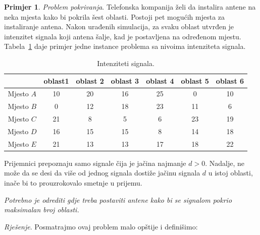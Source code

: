 \documentclass[a4paper, utf8, 11pt, colorlinks]{book}
\theoremstyle{definition}
\newtheorem{primjer}{Primjer}[chapter]
\begin{document}
\begin{primjer}

\emph{Problem pokrivanja}. Telefonska kompanija želi da instalira antene na neka mjesta kako bi pokrila šest oblasti. Postoji pet mogućih mjesta za instaliranje antena. Nakon urađenih simulacija, za svaku oblast utvrđen je intenzitet signala koji antena šalje, kad je postavljena na određenom mjestu. Tabela~\ref{tab:tb-3} daje   primjer jedne instance problema sa nivoima intenziteta signala.

\begin{table}[!ht]
	\centering
	\begin{tabular}{c|cccccc} \hline
		\              & oblast1 & oblast 2 & oblast 3 & oblast 4 & oblast 5 & oblast 6 \\ \hline
		Mjesto $A$     & 10  & 20 & 16 & 25 & 0   & 10   \\
		Mjesto $B$     & 0   & 12 & 18 &  23 & 11 & 6   \\
		Mjesto $C$     & 21  &  8 & 5  &  6 & 23  &  19 \\
		Mjesto $D$    &  16 &  15 & 15 &  8 & 14 & 18   \\
		Mjesto $E $    &  21 & 13 & 13 & 17 & 18  & 22    \\ \hline
	\end{tabular}
	\caption{Intenziteti signala.}
	\label{tab:tb-3}
\end{table}

Prijemnici prepoznaju samo signale čija je jačina najmanje   $d>0$. Nadalje, ne može da se desi da više od jednog signala  dostiže jačinu signala $d$ u istoj oblasti, inače bi to prouzrokovalo smetnje u prijemu. %

\emph{Potrebno je odrediti gdje treba postaviti antene kako bi se signalom pokrio maksimalan broj oblasti.}
\end{primjer}
\emph{Rješenje}. Posmatrajmo ovaj problem malo opštije i definišimo: 
\end{document}
